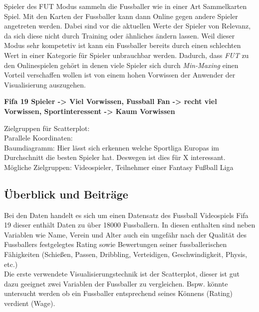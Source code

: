 \documentclass[usegeometry=true]{scrartcl}
\begin{document}
Spieler des FUT Modus sammeln die Fussballer wie in einer Art Sammelkarten Spiel. Mit den Karten der Fussballer kann dann Online gegen andere Spieler angetreten werden. Dabei sind vor die aktuellen Werte der Spieler von Relevanz, da sich diese nicht durch Training oder ähnliches ändern lassen. Weil dieser Modus sehr kompetetiv ist kann ein Fussballer bereits durch einen schlechten Wert in einer Kategorie für Spieler unbrauchbar werden. Dadurch, dass \textit{FUT} zu den Onlinespielen gehört in denen viele Spieler sich durch \textit{Min-Maxing}\cite{noauthor_min-maxing_2014} einen Vorteil verschaffen wollen ist von einem hohen Vorwissen der Anwender der Visualisierung auszugehen.  




\textbf{Fifa 19 Spieler -> Viel Vorwissen, Fussball Fan -> recht viel Vorwissen, Sportinteressent -> Kaum Vorwissen}

Zielgruppen für Scatterplot:\\
Parallele Koordinaten:\\
Baumdiagramm: Hier lässt sich erkennen welche Sportliga Europas im Durchschnitt die besten Spieler hat. Deswegen ist dies für X interessant.\\
Mögliche Zielgruppen: Videospieler, Teilnehmer einer Fantasy Fußball Liga
\subsection{Überblick und Beiträge}



Bei den Daten handelt es sich um einen Datensatz des Fussball Videospiels Fifa 19 dieser enthält Daten zu über 18000 Fussballern. In diesen enthalten sind neben Variablen wie Name, Verein und Alter auch ein ungefähr nach der Qualität des Fussballers festgelegtes Rating sowie Bewertungen seiner fussballerischen Fähigkeiten (Schießen, Passen, Dribbling, Verteidigen, Geschwindigkeit, Physis, etc.)\\

Die erste verwendete Visualisierungstechnik ist der Scatterplot, dieser ist gut dazu geeignet zwei Variablen der Fussballer zu vergleichen. Bspw. könnte untersucht werden ob ein Fussballer entsprechend seines Könnens (Rating) verdient (Wage). \\
\end{document}
